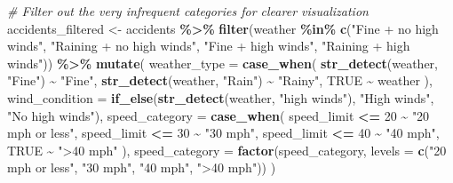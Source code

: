 \documentclass[
]{article}
\newenvironment{Shaded}{\begin{snugshade}}{\end{snugshade}}
\newcommand{\AttributeTok}[1]{\textcolor[rgb]{0.13,0.29,0.53}{#1}}
\newcommand{\CommentTok}[1]{\textcolor[rgb]{0.56,0.35,0.01}{\textit{#1}}}
\newcommand{\ConstantTok}[1]{\textcolor[rgb]{0.56,0.35,0.01}{#1}}
\newcommand{\DecValTok}[1]{\textcolor[rgb]{0.00,0.00,0.81}{#1}}
\newcommand{\FunctionTok}[1]{\textcolor[rgb]{0.13,0.29,0.53}{\textbf{#1}}}
\newcommand{\NormalTok}[1]{#1}
\newcommand{\OtherTok}[1]{\textcolor[rgb]{0.56,0.35,0.01}{#1}}
\newcommand{\SpecialCharTok}[1]{\textcolor[rgb]{0.81,0.36,0.00}{\textbf{#1}}}
\newcommand{\StringTok}[1]{\textcolor[rgb]{0.31,0.60,0.02}{#1}}
\begin{document}
\begin{Shaded}
\begin{Highlighting}[]
\CommentTok{\# Filter out the very infrequent categories for clearer visualization}
\NormalTok{accidents\_filtered }\OtherTok{\textless{}{-}}\NormalTok{ accidents }\SpecialCharTok{\%\textgreater{}\%}
  \FunctionTok{filter}\NormalTok{(weather }\SpecialCharTok{\%in\%} \FunctionTok{c}\NormalTok{(}\StringTok{"Fine + no high winds"}\NormalTok{, }\StringTok{"Raining + no high winds"}\NormalTok{, }\StringTok{"Fine + high winds"}\NormalTok{, }\StringTok{"Raining + high winds"}\NormalTok{)) }\SpecialCharTok{\%\textgreater{}\%}
  \FunctionTok{mutate}\NormalTok{(}
    \AttributeTok{weather\_type =} \FunctionTok{case\_when}\NormalTok{(}
      \FunctionTok{str\_detect}\NormalTok{(weather, }\StringTok{"Fine"}\NormalTok{) }\SpecialCharTok{\textasciitilde{}} \StringTok{"Fine"}\NormalTok{,}
      \FunctionTok{str\_detect}\NormalTok{(weather, }\StringTok{"Rain"}\NormalTok{) }\SpecialCharTok{\textasciitilde{}} \StringTok{"Rainy"}\NormalTok{,}
      \ConstantTok{TRUE} \SpecialCharTok{\textasciitilde{}}\NormalTok{ weather}
\NormalTok{    ),}
    \AttributeTok{wind\_condition =} \FunctionTok{if\_else}\NormalTok{(}\FunctionTok{str\_detect}\NormalTok{(weather, }\StringTok{"high winds"}\NormalTok{), }\StringTok{"High winds"}\NormalTok{, }\StringTok{"No high winds"}\NormalTok{),}
    \AttributeTok{speed\_category =} \FunctionTok{case\_when}\NormalTok{(}
\NormalTok{      speed\_limit }\SpecialCharTok{\textless{}=} \DecValTok{20} \SpecialCharTok{\textasciitilde{}} \StringTok{"20 mph or less"}\NormalTok{,}
\NormalTok{      speed\_limit }\SpecialCharTok{\textless{}=} \DecValTok{30} \SpecialCharTok{\textasciitilde{}} \StringTok{"30 mph"}\NormalTok{,}
\NormalTok{      speed\_limit }\SpecialCharTok{\textless{}=} \DecValTok{40} \SpecialCharTok{\textasciitilde{}} \StringTok{"40 mph"}\NormalTok{,}
      \ConstantTok{TRUE} \SpecialCharTok{\textasciitilde{}} \StringTok{"\textgreater{}40 mph"}
\NormalTok{    ),}
    \AttributeTok{speed\_category =} \FunctionTok{factor}\NormalTok{(speed\_category, }\AttributeTok{levels =} \FunctionTok{c}\NormalTok{(}\StringTok{"20 mph or less"}\NormalTok{, }\StringTok{"30 mph"}\NormalTok{, }\StringTok{"40 mph"}\NormalTok{, }\StringTok{"\textgreater{}40 mph"}\NormalTok{))}
\NormalTok{  )}


\end{Highlighting}
\end{Shaded}
\end{document}
